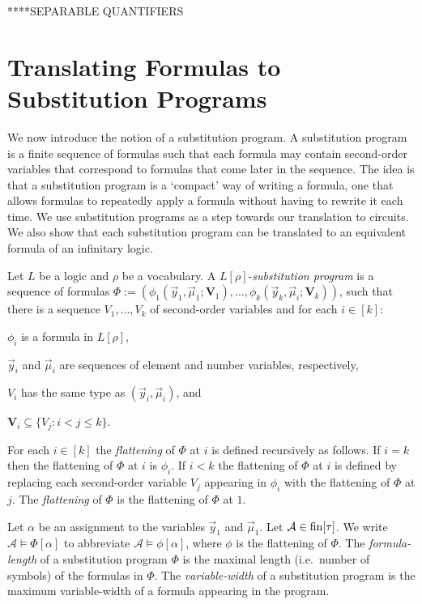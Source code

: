 \documentclass[../main/thesis.tex]{subfiles}
\begin{document}
****SEPARABLE QUANTIFIERS

\section{Translating Formulas to Substitution Programs}
We now introduce the notion of a substitution program. A substitution program is
a finite sequence of formulas such that each formula may contain second-order
variables that correspond to formulas that come later in the sequence. The idea
is that a substitution program is a `compact' way of writing a formula, one that
allows formulas to repeatedly apply a formula without having to rewrite it each
time. We use substitution programs as a step towards our translation to
circuits. We also show that each substitution program can be translated to an
equivalent formula of an infinitary logic.

\begin{definition}
  Let $L$ be a logic and $\rho$ be a vocabulary. A $L[\rho]$-\emph{substitution
    program} is a sequence of formulas $\Phi := (\phi_1(\vec{y}_1, \vec{\mu}_1;
  \boldsymbol{V}_1), \ldots, \phi_k(\vec{y}_k, \vec{\mu}_i;\boldsymbol{V}_k))$,
  such that there is a sequence $V_1, \ldots, V_k$ of second-order variables and
  for each $i \in [k]$:
  \begin{myitemize}
  \item $\phi_i$ is a formula in $L[\rho]$,
  \item $\vec{y}_i$ and $\vec{\mu}_i$ are sequences of element and number
    variables, respectively,
  \item $V_i$ has the same type as $(\vec{y}_i, \vec{\mu}_i)$, and
  \item $\boldsymbol{V}_i \subseteq \{V_j : i < j \leq k\}$.
  \end{myitemize}
  For each $i \in [k]$ the \emph{flattening} of $\Phi$ at $i$ is defined
  recursively as follows. If $i = k$ then the flattening of $\Phi$ at $i$ is
  $\phi_i$. If $i < k$ the flattening of $\Phi$ at $i$ is defined by replacing
  each second-order variable $V_j$ appearing in $\phi_i$ with the flattening of
  $\Phi$ at $j$. The \emph{flattening} of $\Phi$ is the flattening of $\Phi$ at
  $1$.

  Let $\alpha$ be an assignment to the variables $\vec{y}_1$ and $\vec{\mu}_1$.
  Let $\mathcal{A} \in \text{\upshape fin}[\tau]$. We write $\mathcal{A} \models \Phi[\alpha]$
  to abbreviate $\mathcal{A} \models \phi[\alpha]$, where $\phi$ is the
  flattening of $\Phi$. The \emph{formula-length} of a substitution program
  $\Phi$ is the maximal length (i.e.\ number of symbols) of the formulas in
  $\Phi$. The \emph{variable-width} of a substitution program is the maximum
  variable-width of a formula appearing in the program.
\end{definition}
\end{document}
